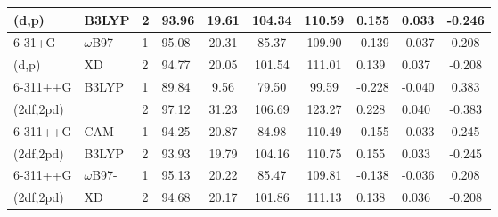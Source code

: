 \begin{table}[h]
\begin{tabular}{|p{20mm}|p{17mm}|l|l|c|c|c|ccc|}
(d,p) & B3LYP & 2 & 93.96 & 19.61 & 104.34 & 110.59 & \multicolumn{1}{l|}{0.155} & \multicolumn{1}{l|}{0.033} & -0.246 \\ \hline
6-31+G & $\omega$B97- & 1 & 95.08 & 20.31 & 85.37 & 109.90 & \multicolumn{1}{l|}{-0.139} & \multicolumn{1}{l|}{-0.037} & 0.208 \\ \cline{3-10} 
(d,p) & XD & 2 & 94.77 & 20.05 & 101.54 & 111.01 & \multicolumn{1}{l|}{0.139} & \multicolumn{1}{l|}{0.037} & -0.208 \\ \hline
6-311++G & B3LYP & 1 & 89.84 & 9.56 & 79.50 & 99.59 & \multicolumn{1}{l|}{-0.228} & \multicolumn{1}{l|}{-0.040} & 0.383 \\ \cline{3-10} 
(2df,2pd) & & 2 & 97.12 & 31.23 & 106.69 & 123.27 & \multicolumn{1}{l|}{0.228} & \multicolumn{1}{l|}{0.040} & -0.383 \\ \hline
6-311++G & CAM- & 1 & 94.25 & 20.87 & 84.98 & 110.49 & \multicolumn{1}{l|}{-0.155} & \multicolumn{1}{l|}{-0.033} & 0.245 \\ \cline{3-10} 
(2df,2pd) & B3LYP & 2 & 93.93 & 19.79 & 104.16 & 110.75 & \multicolumn{1}{l|}{0.155} & \multicolumn{1}{l|}{0.033} & -0.245 \\ \hline
6-311++G & $\omega$B97- & 1 & 95.13 & 20.22 & 85.47 & 109.81 & \multicolumn{1}{l|}{-0.138} & \multicolumn{1}{l|}{-0.036} & 0.208 \\ \cline{3-10} 
(2df,2pd) & XD & 2 & 94.68 & 20.17 & 101.86 & 111.13 & \multicolumn{1}{l|}{0.138} & \multicolumn{1}{l|}{0.036} & -0.208 \\ \hline
\end{tabular}
\end{table}

